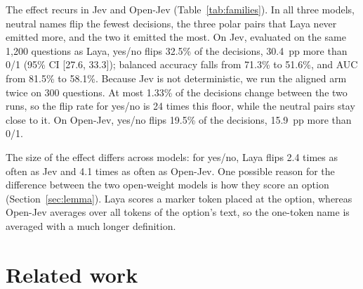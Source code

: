 \documentclass[11pt]{article}
\newcommand{\opt}[1]{\textsf{#1}}          %
\begin{document}
The effect recurs in Jev and Open-Jev (Table~\ref{tab:families}). In all three models, neutral names
flip the fewest decisions, the three polar pairs that Laya never emitted more, and the two it
emitted the most. On Jev, evaluated on the same 1,200 questions as Laya, \opt{yes}/\opt{no} flips
32.5\% of the decisions, 30.4~pp more than \opt{0}/\opt{1} (95\% CI [27.6, 33.3]); balanced
accuracy falls from 71.3\% to 51.6\%, and AUC from 81.5\% to 58.1\%. Because Jev is not
deterministic, we run the aligned arm twice on 300 questions. At most 1.33\% of the decisions change
between the two runs, so the flip rate for \opt{yes}/\opt{no} is 24 times this floor, while the
neutral pairs stay close to it. On Open-Jev, \opt{yes}/\opt{no} flips 19.5\% of the decisions,
15.9~pp more than \opt{0}/\opt{1}.

The size of the effect differs across models: for \opt{yes}/\opt{no}, Laya flips 2.4 times as often
as Jev and 4.1 times as often as Open-Jev. One possible reason for the difference between the two
open-weight models is how they score an option (Section~\ref{sec:lemma}). Laya scores a marker token
placed at the option, whereas Open-Jev averages over all tokens of the option's text, so the
one-token name is averaged with a much longer definition.

\begin{table}[t]
\centering\small

\caption{Flip rate (\%) by name pair (top) and name class (bottom) for the three models. The
ordering of the name classes holds in all three; the magnitudes differ.}
\label{tab:families}
\end{table}

\section{Related work}
\end{document}
